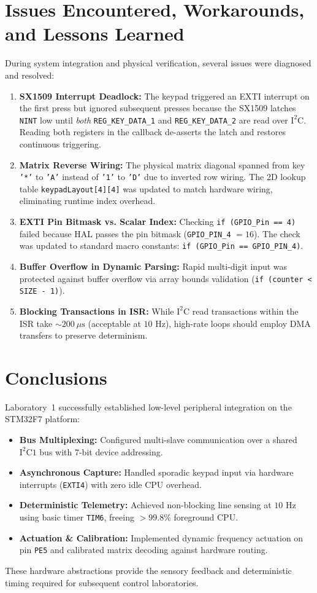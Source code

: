 \section{Issues Encountered, Workarounds, and Lessons Learned}
During system integration and physical verification, several issues were diagnosed and resolved:
\begin{enumerate}[topsep=1pt,itemsep=1pt]
    \item \textbf{SX1509 Interrupt Deadlock:} The keypad triggered an EXTI interrupt on the first press but ignored subsequent presses because the SX1509 latches \texttt{NINT} low until \textit{both} \texttt{REG\_KEY\_DATA\_1} and \texttt{REG\_KEY\_DATA\_2} are read over $\text{I}^2\text{C}$. Reading both registers in the callback de-asserts the latch and restores continuous triggering.
    \item \textbf{Matrix Reverse Wiring:} The physical matrix diagonal spanned from key \texttt{'*'} to \texttt{'A'} instead of \texttt{'1'} to \texttt{'D'} due to inverted row wiring. The 2D lookup table \texttt{keypadLayout[4][4]} was updated to match hardware wiring, eliminating runtime index overhead.
    \item \textbf{EXTI Pin Bitmask vs. Scalar Index:} Checking \texttt{if (GPIO\_Pin == 4)} failed because HAL passes the pin bitmask (\texttt{GPIO\_PIN\_4} $= 16$). The check was updated to standard macro constants: \texttt{if (GPIO\_Pin == GPIO\_PIN\_4)}.
    \item \textbf{Buffer Overflow in Dynamic Parsing:} Rapid multi-digit input was protected against buffer overflow via array bounds validation (\texttt{if (counter < SIZE - 1)}).
    \item \textbf{Blocking Transactions in ISR:} While $\text{I}^2\text{C}$ read transactions within the ISR take $\sim 200\ \mu\text{s}$ (acceptable at $10\text{ Hz}$), high-rate loops should employ DMA transfers to preserve determinism.
\end{enumerate}

\section{Conclusions}
Laboratory~1 successfully established low-level peripheral integration on the STM32F7 platform:
\begin{itemize}[noitemsep,topsep=1pt]
    \item \textbf{Bus Multiplexing:} Configured multi-slave communication over a shared $\text{I}^2\text{C}1$ bus with 7-bit device addressing.
    \item \textbf{Asynchronous Capture:} Handled sporadic keypad input via hardware interrupts (\texttt{EXTI4}) with zero idle CPU overhead.
    \item \textbf{Deterministic Telemetry:} Achieved non-blocking line sensing at $10\text{ Hz}$ using basic timer \texttt{TIM6}, freeing $>99.8\%$ foreground CPU.
    \item \textbf{Actuation \& Calibration:} Implemented dynamic frequency actuation on pin \texttt{PE5} and calibrated matrix decoding against hardware routing.
\end{itemize}
These hardware abstractions provide the sensory feedback and deterministic timing required for subsequent control laboratories.
